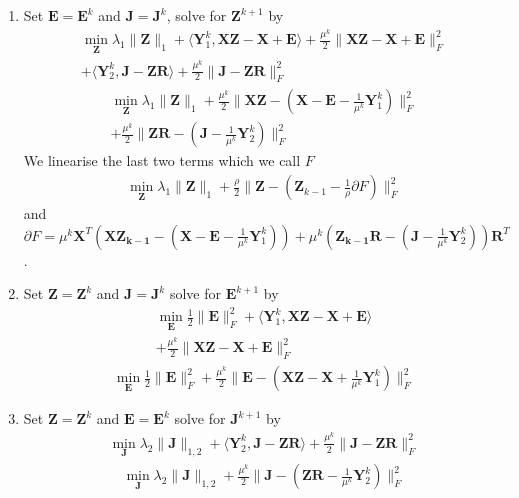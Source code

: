 \documentclass{article}
\begin{document}
\begin{enumerate}

\item Set $\mathbf E = \mathbf E^k$ and $\mathbf J = \mathbf J^k$, solve for $\mathbf Z^{k+1}$ by
\begin{align*}
\min_{\mathbf Z} \lambda_1 \| \mathbf Z \|_1 + \langle \mathbf Y^k_1, \mathbf{XZ} - \mathbf X + \mathbf E \rangle +\frac{\mu^k}2\|\mathbf{XZ} - \mathbf X + \mathbf E\|^2_F\\
+ \langle \mathbf Y^k_2, \mathbf J - \mathbf Z\mathbf R\rangle +\frac{\mu^k}2\|\mathbf J - \mathbf Z\mathbf R\|^2_F
\end{align*}
\begin{align*}
\min_{\mathbf Z} \lambda_1 \| \mathbf Z \|_1 + \frac{\mu^k}2\|\mathbf{XZ} - (\mathbf X - \mathbf E - \frac{1}{\mu^k} \mathbf Y^k_1)\|^2_F \\ + \frac{\mu^k}2\| \mathbf Z\mathbf R - (\mathbf J - \frac{1}{\mu^k} \mathbf Y^k_2)\|^2_F
\end{align*}
We linearise the last two terms which we call $F$
\begin{align*}
\min_{\mathbf Z} \lambda_1 \| \mathbf Z \|_1 + \frac{\rho}{2} \| \mathbf Z - (\mathbf Z_{k-1} - \frac{1}{\rho} \partial F) \|_F^2
\end{align*}
and $\partial F = \mu^k \mathbf X^T (\mathbf{XZ_{k-1}} - (\mathbf X - \mathbf E - \frac{1}{\mu^k} \mathbf Y^k_1)) + \mu^k(\mathbf{Z_{k-1}R} - (\mathbf J - \frac{1}{\mu^k} \mathbf Y^k_2))\mathbf R^T$.

\item Set $\mathbf Z = \mathbf Z^k$ and $\mathbf J = \mathbf J^k$ solve for $\mathbf E^{k+1}$ by
\begin{align*}
\min_{\mathbf E} \frac12\|\mathbf E\|^2_F + \langle \mathbf Y^k_1, \mathbf{XZ} - \mathbf X + \mathbf E \rangle \\ + \frac{\mu^k}2\|\mathbf{XZ} - \mathbf X + \mathbf E\|^2_F 
\end{align*}
\begin{align*}
\min_{\mathbf E} \frac12\|\mathbf E\|^2_F + \frac{\mu^k}2\| \mathbf E - (\mathbf{XZ} - \mathbf X + \frac{1}{\mu^k} \mathbf Y^k_1) \|^2_F 
\end{align*}


\item Set $\mathbf Z = \mathbf Z^k$ and $\mathbf E = \mathbf E^k$ solve for $\mathbf J^{k+1}$ by
\begin{align*}
\min_{\mathbf J} \lambda_2\|\mathbf J\|_{1,2} + \langle \mathbf Y^k_2, \mathbf J - \mathbf Z\mathbf R\rangle +\frac{\mu^k}2\|\mathbf J - \mathbf Z\mathbf R\|^2_F
\end{align*}
\begin{align*}
\min_{\mathbf J} \lambda_2\|\mathbf J\|_{1,2} + \frac{\mu^k}2\|\mathbf J - (\mathbf Z\mathbf R - \frac{1}{\mu^k} \mathbf Y^k_2) \|^2_F
\end{align*}


\end{enumerate}
\end{document}
